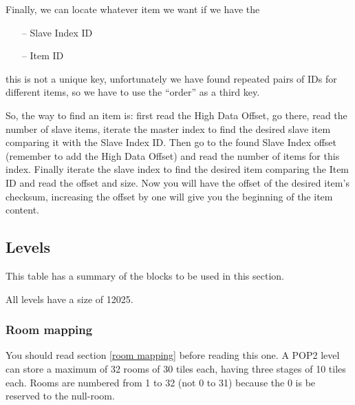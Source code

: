 \documentclass{article}
\begin{document}

 Finally, we can locate whatever item we want if we have the
 \begin{itemize}
 \item[--] Slave Index ID
 \item[--] Item ID
 \end{itemize}
 this is not a unique key, unfortunately we have found repeated pairs of
 IDs for different items, so we have to use the ``order'' as a third key.

 So, the way to find an item is: first read the High Data Offset, go there,
 read the number of slave items, iterate the master index to find the
 desired slave item comparing it with the Slave Index ID. Then go to the
 found Slave Index offset (remember to add the High Data Offset) and read
 the number of items for this index. Finally iterate the slave index to
 find the desired item comparing the Item ID and read the offset and size.
 Now you will have the offset of the desired item's checksum, increasing
 the offset by one will give you the beginning of the item content.

\subsection{Levels}

 This table has a summary of the blocks to be used in this section.


 All levels have a size of 12025.

\subsubsection{Room mapping \label{dat2 room mapping}} %
 You should read section \ref{room mapping} before reading this one.
 A POP2 level can store a maximum of 32 rooms of 30 tiles each, having 
 three stages of 10 tiles each. Rooms are numbered from 1 to 32 (not 0 to 
 31) because the 0 is be reserved to the null-room.
\end{document}
